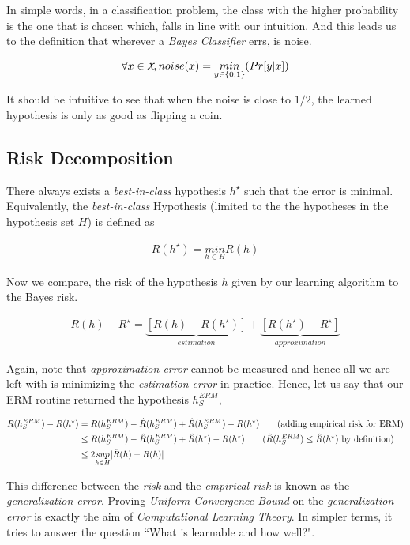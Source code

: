 \documentclass[../toml]{subfiles}
\begin{document}
In simple words, in a classification problem, the class with the higher probability is the
one that is chosen which, falls in line with our intuition. And this leads us to the definition
that wherever a \textit{Bayes Classifier} errs, is noise.

\begin{definition}[Noise] \label{def:noise}
\begin{align}
\forall x \in \cursive{X}, noise(x) = \underset{y\in\{0,1\}}{min} (Pr[y|x])
\end{align}
\end{definition}

It should be intuitive to see that when the noise is close to $1/2$, the learned hypothesis
is only as good as flipping a coin.

\subsection{Risk Decomposition}

There always exists a \textit{best-in-class} hypothesis $h^\star$ such that the error is
minimal. Equivalently, the \textit{best-in-class} Hypothesis (limited to the the hypotheses
in the hypothesis set $H$) is defined as

\begin{definition}
\begin{align}
R(h^\star) = \underset{h \in H}{min} R(h)
\end{align}
\end{definition}

Now we compare, the risk of the hypothesis $h$ given by our learning algorithm to the
Bayes risk.

\begin{align}
R(h) - R^\star = \underbrace{\left[R(h) - R(h^\star)\right]}_{estimation} + \underbrace{\left[ R(h^\star) - R^\star \right]}_{approximation}
\end{align}

Again, note that \textit{approximation error} cannot be measured and hence all we
are left with is minimizing the \textit{estimation error} in practice. Hence, let us say that
our ERM routine returned the hypothesis $h_S^{ERM}$,

\begin{align}
R(h_S^{ERM}) - R(h^\star) &= R(h_S^{ERM}) - \hat{R}(h_S^{ERM}) + \hat{R}(h_S^{ERM}) - R(h^\star) \tag{adding empirical risk for ERM} \\
&\leq R(h_S^{ERM}) - \hat{R}(h_S^{ERM}) + \hat{R}(h^\star) - R(h^\star) \tag{$\hat{R}(h_S^{ERM}) \leq \hat{R}(h^\star)$ by definition} \\
&\leq 2 \underset{h \in H}{sup} | \hat{R}(h) - R(h) |
\end{align}

This difference between the \textit{risk} and the \textit{empirical risk} is known as the
\textit{generalization error}. Proving \textit{Uniform Convergence Bound} on the
\textit{generalization error} is exactly the aim of \textit{Computational Learning Theory}.
In simpler terms, it tries to answer the question ``What is learnable and how well?".
\end{document}
